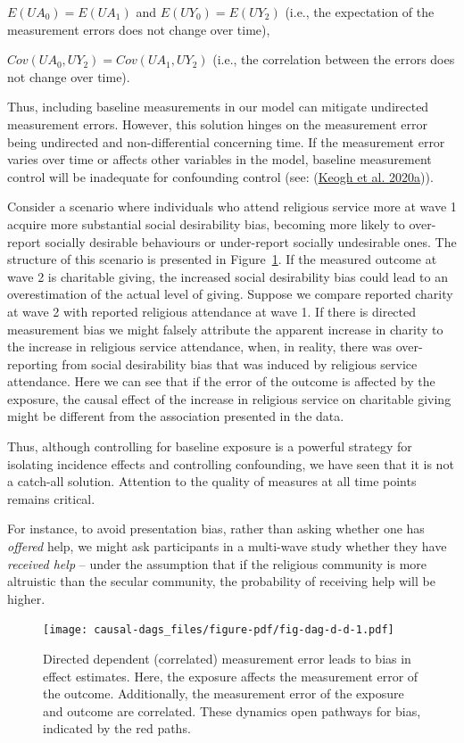 \documentclass[
  singlecolumn]{report}
\begin{document}
\(E(UA_0) = E(UA_1)\) and \(E(UY_0) = E(UY_2)\) (i.e., the expectation
of the measurement errors does not change over time),

\(Cov(UA_0, UY_2) = Cov(UA_1, UY_2)\) (i.e., the correlation between the
errors does not change over time).

Thus, including baseline measurements in our model can mitigate
undirected measurement errors. However, this solution hinges on the
measurement error being undirected and non-differential concerning time.
If the measurement error varies over time or affects other variables in
the model, baseline measurement control will be inadequate for
confounding control (see: (\protect\hyperlink{ref-keogh2020a}{Keogh et
al. 2020a})).

Consider a scenario where individuals who attend religious service more
at wave 1 acquire more substantial social desirability bias, becoming
more likely to over-report socially desirable behaviours or under-report
socially undesirable ones. The structure of this scenario is presented
in Figure~\ref{fig-dag-d-d}. If the measured outcome at wave 2 is
charitable giving, the increased social desirability bias could lead to
an overestimation of the actual level of giving. Suppose we compare
reported charity at wave 2 with reported religious attendance at wave 1.
If there is directed measurement bias we might falsely attribute the
apparent increase in charity to the increase in religious service
attendance, when, in reality, there was over-reporting from social
desirability bias that was induced by religious service attendance. Here
we can see that if the error of the outcome is affected by the exposure,
the causal effect of the increase in religious service on charitable
giving might be different from the association presented in the data.

Thus, although controlling for baseline exposure is a powerful strategy
for isolating incidence effects and controlling confounding, we have
seen that it is not a catch-all solution. Attention to the quality of
measures at all time points remains critical.

For instance, to avoid presentation bias, rather than asking whether one
has \emph{offered} help, we might ask participants in a multi-wave study
whether they have \emph{received help} -- under the assumption that if
the religious community is more altruistic than the secular community,
the probability of receiving help will be higher.

\begin{figure}

{\centering \texttt{[image: causal-dags\_files/figure-pdf/fig-dag-d-d-1.pdf]}

}

\caption{\label{fig-dag-d-d}Directed dependent (correlated) measurement
error leads to bias in effect estimates. Here, the exposure affects the
measurement error of the outcome. Additionally, the measurement error of
the exposure and outcome are correlated. These dynamics open pathways
for bias, indicated by the red paths.}

\end{figure}
\end{document}
